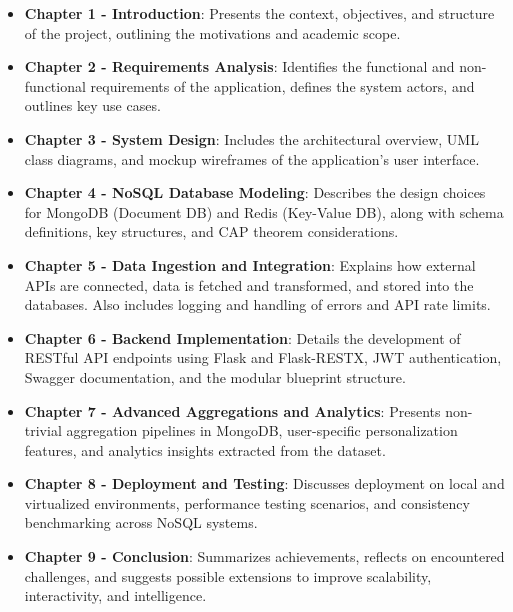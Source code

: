 \begin{itemize}
    \item \textbf{Chapter 1 - Introduction}: Presents the context, objectives, and structure of the project, outlining the motivations and academic scope.
    \item \textbf{Chapter 2 - Requirements Analysis}: Identifies the functional and non-functional requirements of the application, defines the system actors, and outlines key use cases.
    \item \textbf{Chapter 3 - System Design}: Includes the architectural overview, UML class diagrams, and mockup wireframes of the application’s user interface.
    \item \textbf{Chapter 4 - NoSQL Database Modeling}: Describes the design choices for MongoDB (Document DB) and Redis (Key-Value DB), along with schema definitions, key structures, and CAP theorem considerations.
    \item \textbf{Chapter 5 - Data Ingestion and Integration}: Explains how external APIs are connected, data is fetched and transformed, and stored into the databases.
    Also includes logging and handling of errors and API rate limits.
    \item \textbf{Chapter 6 - Backend Implementation}: Details the development of RESTful API endpoints using Flask and Flask-RESTX, JWT authentication, Swagger documentation, and the modular blueprint structure.
    \item \textbf{Chapter 7 - Advanced Aggregations and Analytics}: Presents non-trivial aggregation pipelines in MongoDB, user-specific personalization features, and analytics insights extracted from the dataset.
    \item \textbf{Chapter 8 - Deployment and Testing}: Discusses deployment on local and virtualized environments, performance testing scenarios, and consistency benchmarking across NoSQL systems.
    \item \textbf{Chapter 9 - Conclusion}: Summarizes achievements, reflects on encountered challenges, and suggests possible extensions to improve scalability, interactivity, and intelligence.
\end{itemize}


